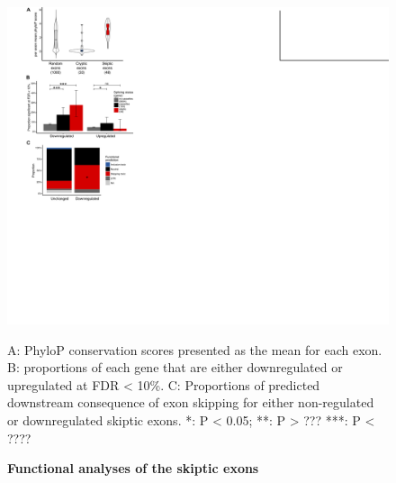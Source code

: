 \begin{figure}[h!]
	\centering
	\includegraphics[width=18cm]{Figures/05_tdp_mice/functional_plots_vertical.png}
	\caption{\textbf{Functional analyses of the skiptic exons}}
	A: PhyloP conservation scores presented as the mean for each exon. B: proportions of each gene that are either downregulated or upregulated at FDR < 10\%. C: Proportions of predicted downstream consequence of exon skipping for either non-regulated or downregulated skiptic exons. *: P < 0.05; **: P > ??? ***: P < ????
	\label{fig:functional_plots}
\end{figure}


